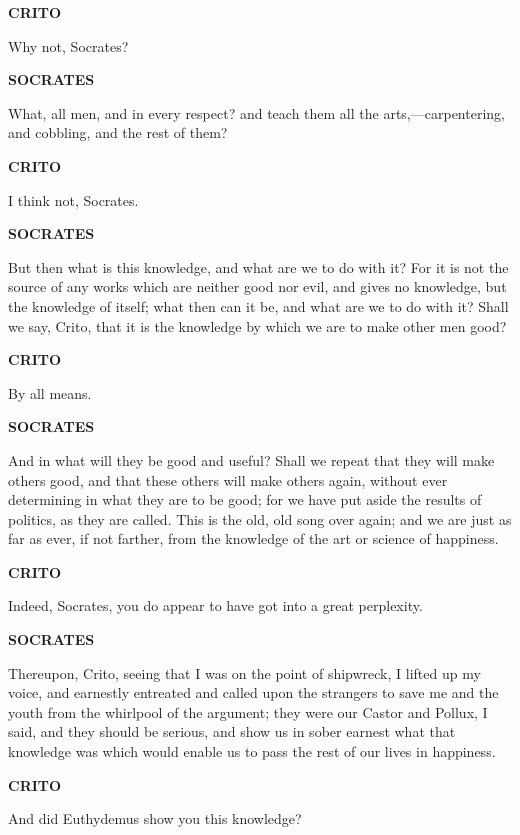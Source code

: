 \documentclass[11pt,letter]{article}
\begin{document}
\par \textbf{CRITO}
\par   Why not, Socrates?

\par \textbf{SOCRATES}
\par   What, all men, and in every respect? and teach them all the arts,—carpentering, and cobbling, and the rest of them?

\par \textbf{CRITO}
\par   I think not, Socrates.

\par \textbf{SOCRATES}
\par   But then what is this knowledge, and what are we to do with it? For it is not the source of any works which are neither good nor evil, and gives no knowledge, but the knowledge of itself; what then can it be, and what are we to do with it? Shall we say, Crito, that it is the knowledge by which we are to make other men good?

\par \textbf{CRITO}
\par   By all means.

\par \textbf{SOCRATES}
\par   And in what will they be good and useful? Shall we repeat that they will make others good, and that these others will make others again, without ever determining in what they are to be good; for we have put aside the results of politics, as they are called. This is the old, old song over again; and we are just as far as ever, if not farther, from the knowledge of the art or science of happiness.

\par \textbf{CRITO}
\par   Indeed, Socrates, you do appear to have got into a great perplexity.

\par \textbf{SOCRATES}
\par   Thereupon, Crito, seeing that I was on the point of shipwreck, I lifted up my voice, and earnestly entreated and called upon the strangers to save me and the youth from the whirlpool of the argument; they were our Castor and Pollux, I said, and they should be serious, and show us in sober earnest what that knowledge was which would enable us to pass the rest of our lives in happiness.

\par \textbf{CRITO}
\par   And did Euthydemus show you this knowledge?
\end{document}
